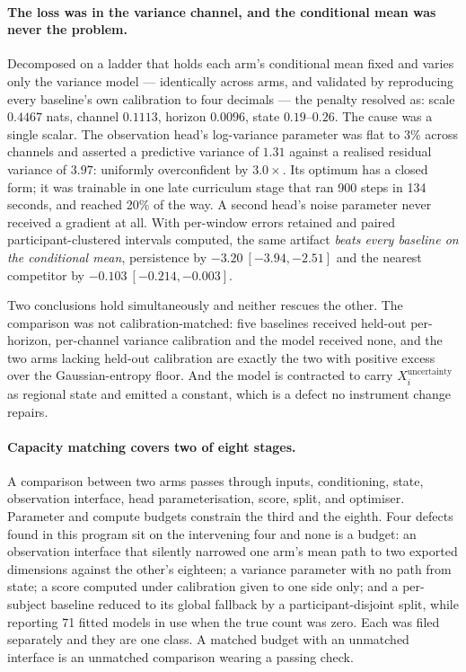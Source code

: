 \paragraph{The loss was in the variance channel, and the conditional mean was
never the problem.}
Decomposed on a ladder that holds each arm's conditional mean fixed and varies
only the variance model --- identically across arms, and validated by
reproducing every baseline's own calibration to four decimals --- the penalty
resolved as: scale \(0.4467\) nats, channel \(0.1113\), horizon \(0.0096\),
state \(0.19\)--\(0.26\). The cause was a single scalar. The observation head's
log-variance parameter was flat to 3\% across channels and asserted a
predictive variance of \(1.31\) against a realised residual variance of
\(3.97\): uniformly overconfident by \(3.0\times\). Its optimum has a closed
form; it was trainable in one late curriculum stage that ran 900 steps in 134
seconds, and reached 20\% of the way. A second head's noise parameter never
received a gradient at all. With per-window errors retained and paired
participant-clustered intervals computed, the same artifact \emph{beats every
baseline on the conditional mean}, persistence by
\(-3.20\ [-3.94, -2.51]\) and the nearest competitor by
\(-0.103\ [-0.214, -0.003]\).

Two conclusions hold simultaneously and neither rescues the other. The
comparison was not calibration-matched: five baselines received held-out
per-horizon, per-channel variance calibration and the model received none, and
the two arms lacking held-out calibration are exactly the two with positive
excess over the Gaussian-entropy floor. And the model is contracted to carry
\(X_i^{\mathrm{uncertainty}}\) as regional state and emitted a constant, which
is a defect no instrument change repairs.

\paragraph{Capacity matching covers two of eight stages.}
A comparison between two arms passes through inputs, conditioning, state,
observation interface, head parameterisation, score, split, and optimiser.
Parameter and compute budgets constrain the third and the eighth. Four defects
found in this program sit on the intervening four and none is a budget: an
observation interface that silently narrowed one arm's mean path to two
exported dimensions against the other's eighteen; a variance parameter with no
path from state; a score computed under calibration given to one side only;
and a per-subject baseline reduced to its global fallback by a
participant-disjoint split, while reporting 71 fitted models in use when the
true count was zero. Each was filed separately and they are one class. A
matched budget with an unmatched interface is an unmatched comparison wearing
a passing check.

